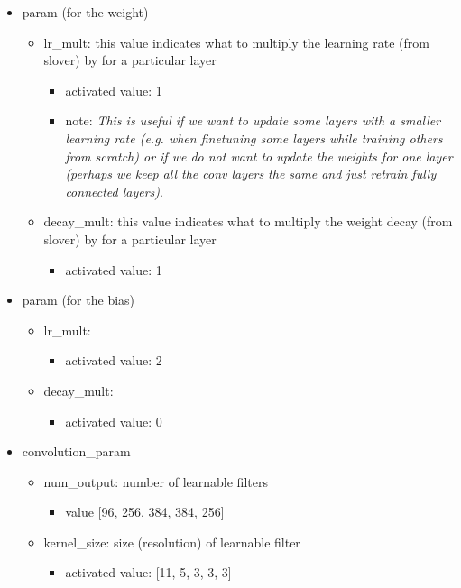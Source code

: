 \documentclass[11pt]{article}
\begin{document}
\begin{itemize}
	\item param (for the weight)
	\begin{itemize}
		\item lr\_mult: this value indicates what to multiply the learning rate (from slover) by for a particular layer
			\begin{itemize}
				\item activated value: 1
				\item note: \textit{This is useful if we want to update some layers with a smaller learning rate (e.g. when finetuning some layers while training others from scratch) or if we do not want to update the weights for one layer (perhaps we keep all the conv layers the same and just retrain fully connected layers)}.
			\end{itemize}
		\item decay\_mult: this value indicates what to multiply the weight decay (from slover) by for a particular layer
			\begin{itemize}
				\item activated value: 1
			\end{itemize}
	\end{itemize}
	\item param (for the bias)
	\begin{itemize}
		\item lr\_mult: 
			\begin{itemize}
				\item activated value: 2
			\end{itemize}
		\item decay\_mult:
			\begin{itemize}
				\item activated value: 0
			\end{itemize}
	\end{itemize}
	\item convolution\_param
	\begin{itemize}
		\item num\_output: number of learnable filters
		\begin{itemize}
			\item value [96, 256, 384, 384, 256]
		\end{itemize}
		\item kernel\_size: size (resolution) of learnable filter
		\begin{itemize}
			\item activated value: [11, 5, 3, 3, 3]
		\end{itemize}

\end{itemize}
\end{itemize}
\end{document}
